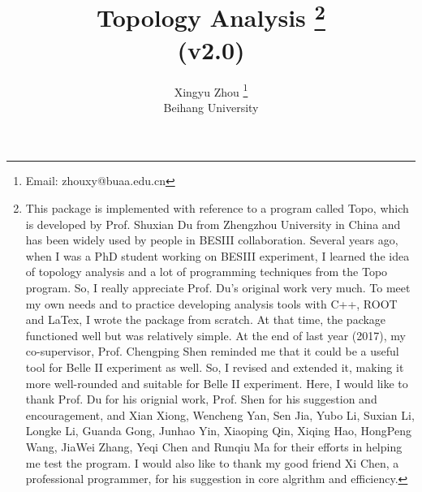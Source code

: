 \documentclass[landscape]{article}
\begin{document}
\title{Topology Analysis \footnote{\normalsize{This package is implemented with reference to a program called {\sc Topo}, which is developed by Prof. Shuxian Du from Zhengzhou University in China and has been widely used by people in BESIII collaboration. Several years ago, when I was a PhD student working on BESIII experiment, I learned the idea of topology analysis and a lot of programming techniques from the {\sc Topo} program. So, I really appreciate Prof. Du's original work very much. To meet my own needs and to practice developing analysis tools with C++, ROOT and LaTex, I wrote the package from scratch. At that time, the package functioned well but was relatively simple. At the end of last year (2017), my co-supervisor, Prof. Chengping Shen reminded me that it could be a useful tool for Belle II experiment as well. So, I revised and extended it, making it more well-rounded and suitable for Belle II experiment. Here, I would like to thank Prof. Du for his orignial work, Prof. Shen for his suggestion and encouragement, and Xian Xiong, Wencheng Yan, Sen Jia, Yubo Li, Suxian Li, Longke Li, Guanda Gong, Junhao Yin, Xiaoping Qin, Xiqing Hao, HongPeng Wang, JiaWei Zhang, Yeqi Chen and Runqiu Ma for their efforts in helping me test the program. I would also like to thank my good friend Xi Chen, a professional programmer, for his suggestion in core algrithm and efficiency.}} \\ \vspace{0.1cm} \Large{(v2.0)}}
\author{Xingyu Zhou \footnote{\normalsize{Email: zhouxy@buaa.edu.cn}} \\ \vspace{0.1cm} Beihang University}
\maketitle

\clearpage


\listoftables


\clearpage
\end{document}
